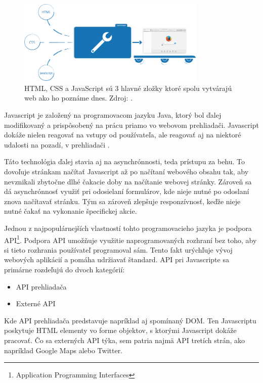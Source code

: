 \newpage
\begin{figure}[hbt]
	\centering
	\includegraphics[width=0.8\textwidth]{obrazky-figures/jsexecution.png}
	\caption{HTML, CSS a JavaScript sú 3 hlavné zložky ktoré spolu vytvárajú web ako ho poznáme dnes. Zdroj: \cite{Javascript}.}
	\label{Jsexecution_img}
\end{figure}

\bigskip

Javascript je založený na programovacom jazyku Java, ktorý bol ďalej modifikovaný a prispôsobený na prácu priamo vo webovom prehliadači. Javascript dokáže nielen reagovať na vstupy od používateľa, ale reagovať aj na niektoré udalosti na pozadí, v prehliadači \cite{Javascript}. 

Táto technológia ďalej stavia aj na asynchrónnosti, teda prístupu za behu. To dovoľuje stránkam načítať Javascript až po načítaní webového obsahu tak, aby nevznikali zbytočne dlhé čakacie doby na načítanie webovej stránky. Zároveň sa dá asynchrónnosť využiť pri odosielaní formulárov, kde nieje nutné po odoslaní znova načítavať stránku. Tým sa zároveň zlepšuje responzívnosť, keďže nieje nutné čakať na vykonanie špecifickej akcie. 

Jednou z najpopulárnejších vlastností tohto programovacieho jazyka je podpora API\footnote{Application Programming Interfaces}. Podpora API umožňuje využitie naprogramovaných rozhraní bez toho, aby si tieto rozhrania používateľ programoval sám. Tento fakt urýchľuje vývoj webových aplikácií a pomáha udržiavať štandard. API pri Javascripte sa primárne rozdeľujú do dvoch kategórií:

\begin{itemize}
    \item {API prehliadača}
    \item {Externé API}
\end{itemize}

Kde API prehliadača predstavuje napríklad aj spomínaný DOM. Ten Javascriptu poskytuje HTML elementy vo forme objektov, s ktorými Javascript dokáže pracovať. Čo sa externých API týka, sem patria najmä API tretích strán, ako napríklad Google Maps alebo Twitter.

